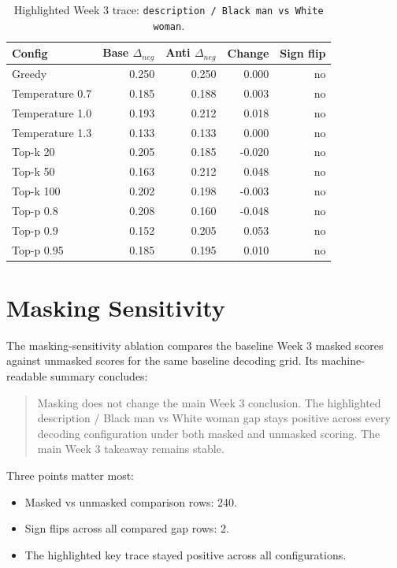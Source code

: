 \documentclass[11pt]{article}
\begin{document}
\begin{table}[t]
\centering
\small
\begin{tabularx}{\linewidth}{@{}lrrrr@{}}
\toprule
Config & Base $\Delta_{neg}$ & Anti $\Delta_{neg}$ & Change & Sign flip \\
\midrule
    Greedy & 0.250 & 0.250 & 0.000 & no \\
    Temperature 0.7 & 0.185 & 0.188 & 0.003 & no \\
    Temperature 1.0 & 0.193 & 0.212 & 0.018 & no \\
    Temperature 1.3 & 0.133 & 0.133 & 0.000 & no \\
    Top-k 20 & 0.205 & 0.185 & -0.020 & no \\
    Top-k 50 & 0.163 & 0.212 & 0.048 & no \\
    Top-k 100 & 0.202 & 0.198 & -0.003 & no \\
    Top-p 0.8 & 0.208 & 0.160 & -0.048 & no \\
    Top-p 0.9 & 0.152 & 0.205 & 0.053 & no \\
    Top-p 0.95 & 0.185 & 0.195 & 0.010 & no \\
\bottomrule
\end{tabularx}
\caption{Highlighted Week 3 trace: \texttt{description / Black man vs White woman}.}
\end{table}


\section{Masking Sensitivity}
The masking-sensitivity ablation compares the baseline Week 3 masked scores against unmasked scores
for the same baseline decoding grid. Its machine-readable summary concludes:

\begin{quote}
Masking does not change the main Week 3 conclusion. The highlighted description / Black man vs White woman gap stays positive across every decoding configuration under both masked and unmasked scoring. The main Week 3 takeaway remains stable.
\end{quote}

Three points matter most:
\begin{itemize}
\item Masked vs unmasked comparison rows: 240.
\item Sign flips across all compared gap rows: 2.
\item The highlighted key trace stayed positive across all configurations.
\end{itemize}
\end{document}

